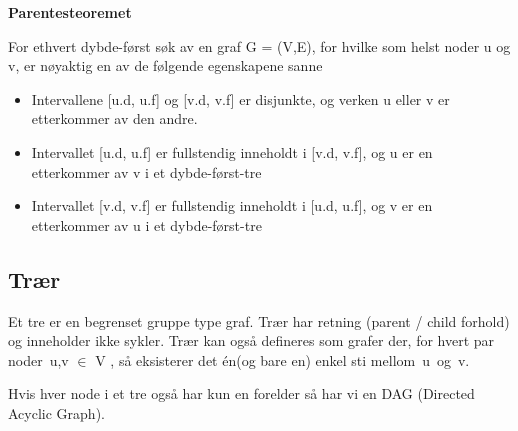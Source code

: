 \documentclass[12pt]{report}
\begin{document}
\vspace{\baselineskip}
{\fontsize{14pt}{16.8pt}\selectfont \textbf{Parentesteoremet}\par}\par

For ethvert dybde-først søk av en graf G = (V,E), for hvilke som helst noder u og v, er nøyaktig en av de følgende egenskapene sanne\par

\begin{itemize}
	\item Intervallene [u.d, u.f] og [v.d, v.f] er disjunkte, og verken u eller v er etterkommer av den andre.\par

	\item Intervallet [u.d, u.f] er fullstendig inneholdt i [v.d, v.f], og u er en etterkommer av v i et dybde-først-tre\par

	\item Intervallet [v.d, v.f] er fullstendig inneholdt i [u.d, u.f], og v er en etterkommer av u i et dybde-først-tre
\end{itemize}\par


\vspace{\baselineskip}

\vspace{\baselineskip}

\vspace{\baselineskip}\subsection*{Trær}
\setlength{\parskip}{10.56pt}
Et tre er en begrenset gruppe type graf. Trær har retning (parent / child forhold) og inneholder ikke sykler. Trær kan også defineres som grafer der, for hvert par noder u,v $ \in $  V , så eksisterer det én(og bare en) enkel sti mellom u og v.\par

Hvis hver node i et tre også har kun en forelder så har vi en DAG (Directed Acyclic Graph).\par
\end{document}
